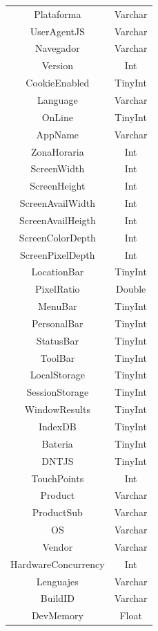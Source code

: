 \begin{itemize}
\begin{table}[H]
\begin{tabular}{c|c}
            Plataforma & Varchar\\
            UserAgentJS & Varchar\\
            Navegador & Varchar\\
            Version & Int\\
            CookieEnabled & TinyInt\\
            Language & Varchar\\
            OnLine & TinyInt\\
            AppName & Varchar\\
            ZonaHoraria & Int\\
            ScreenWidth & Int\\
            ScreenHeight & Int\\
            ScreenAvailWidth & Int\\
            ScreenAvailHeigth & Int\\
            ScreenColorDepth & Int\\
            ScreenPixelDepth & Int\\
            LocationBar & TinyInt\\
            PixelRatio & Double\\
            MenuBar & TinyInt\\
            PersonalBar & TinyInt\\
            StatusBar & TinyInt\\
            ToolBar & TinyInt\\
            LocalStorage & TinyInt\\
            SessionStorage & TinyInt\\
            WindowResults & TinyInt\\
            IndexDB & TinyInt\\
            Bateria & TinyInt\\
            DNTJS & TinyInt\\
            TouchPoints & Int\\
            Product & Varchar\\
            ProductSub & Varchar\\
            OS & Varchar\\
            Vendor & Varchar\\
            HardwareConcurrency & Int\\
            Lenguajes & Varchar\\
            BuildID & Varchar\\
            DevMemory & Float\\

\end{tabular}
\end{table}
\end{itemize}
